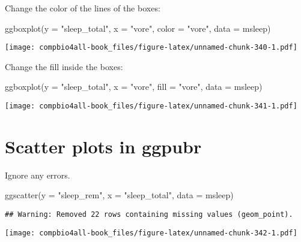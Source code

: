 \documentclass[
]{book}
\newenvironment{Shaded}{\begin{snugshade}}{\end{snugshade}}
\newcommand{\AttributeTok}[1]{\textcolor[rgb]{0.77,0.63,0.00}{#1}}
\newcommand{\FunctionTok}[1]{\textcolor[rgb]{0.00,0.00,0.00}{#1}}
\newcommand{\NormalTok}[1]{#1}
\newcommand{\StringTok}[1]{\textcolor[rgb]{0.31,0.60,0.02}{#1}}
\begin{document}
Change the color of the lines of the boxes:

\begin{Shaded}
\begin{Highlighting}[]
\FunctionTok{ggboxplot}\NormalTok{(}\AttributeTok{y =} \StringTok{"sleep\_total"}\NormalTok{,}
          \AttributeTok{x =} \StringTok{"vore"}\NormalTok{,}
          \AttributeTok{color =} \StringTok{"vore"}\NormalTok{,}
          \AttributeTok{data =}\NormalTok{ msleep)}
\end{Highlighting}
\end{Shaded}

\texttt{[image: compbio4all-book\_files/figure-latex/unnamed-chunk-340-1.pdf]}

Change the fill inside the boxes:

\begin{Shaded}
\begin{Highlighting}[]
\FunctionTok{ggboxplot}\NormalTok{(}\AttributeTok{y =} \StringTok{"sleep\_total"}\NormalTok{,}
          \AttributeTok{x =} \StringTok{"vore"}\NormalTok{,}
          \AttributeTok{fill =} \StringTok{"vore"}\NormalTok{,}
          \AttributeTok{data =}\NormalTok{ msleep)}
\end{Highlighting}
\end{Shaded}

\texttt{[image: compbio4all-book\_files/figure-latex/unnamed-chunk-341-1.pdf]}

\hypertarget{scatter-plots-in-ggpubr}{%
\section{Scatter plots in ggpubr}\label{scatter-plots-in-ggpubr}}

Ignore any errors.

\begin{Shaded}
\begin{Highlighting}[]
\FunctionTok{ggscatter}\NormalTok{(}\AttributeTok{y =} \StringTok{"sleep\_rem"}\NormalTok{,}
          \AttributeTok{x =} \StringTok{"sleep\_total"}\NormalTok{,}
          \AttributeTok{data =}\NormalTok{ msleep)}
\end{Highlighting}
\end{Shaded}

\begin{verbatim}
## Warning: Removed 22 rows containing missing values (geom_point).
\end{verbatim}

\texttt{[image: compbio4all-book\_files/figure-latex/unnamed-chunk-342-1.pdf]}
\end{document}
